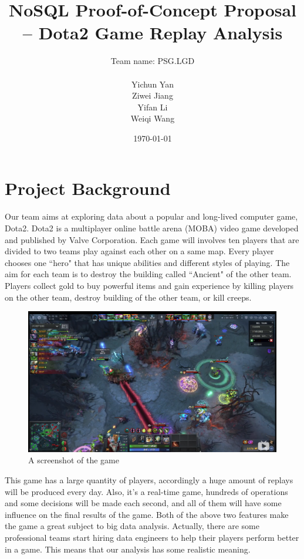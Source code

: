 \documentclass{article}
\title{NoSQL Proof-of-Concept Proposal -- Dota2 Game Replay Analysis}
\author{
	Team name: PSG.LGD \\ \\
	Yichun Yan \\
	Ziwei Jiang \\
	Yifan Li \\
	Weiqi Wang
}
\date{\today}
\begin{document}
\maketitle

\tableofcontents
\clearpage


\section{Project Background}

Our team aims at exploring data about a popular and long-lived computer game, Dota2. Dota2 is a multiplayer online battle arena (MOBA) video game developed and published by Valve Corporation. Each game will involves ten players that are divided to two teams play against each other on a same map. Every player chooses one ``hero" that has unique abilities and different styles of playing. The aim for each team is to destroy the building called ``Ancient" of the other team. Players collect gold to buy powerful items and gain experience by killing players on the other team, destroy building of the other team, or kill creeps.

\begin{figure}[H]
	\centering
	\includegraphics[width=\linewidth]{pic/combat.png}
	\caption{A screenshot of the game}
\end{figure}
This game has a large quantity of players, accordingly a huge amount of replays will be produced every day. Also, it's a real-time game, hundreds of operations and some decisions will be made each second, and all of them will have some influence on the final results of the game. Both of the above two features make the game a great subject to big data analysis. Actually, there are some professional teams start hiring data engineers to help their players perform better in a game. This means that our analysis has some realistic meaning.
\end{document}
